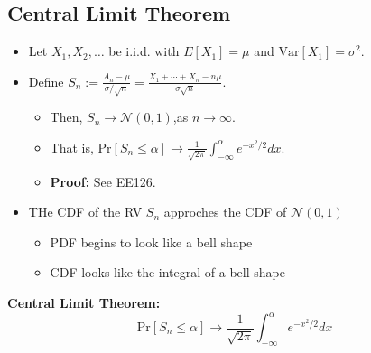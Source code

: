 \documentclass{article}
\newcommand{\x}[1]{\textrm{#1}}
\newcommand{\pr}[1]{\textrm{Pr}[#1]}
\newcommand{\eq}[1]{\begin{equation}#1\end{equation}}
\newcommand{\eqs}[1]{\begin{mdframed}#1\end{mdframed}}
\newcommand{\items}[1]{\begin{itemize}#1\end{itemize}}
\newcommand{\E}[1]{E[#1]}
\newcommand{\var}[1]{\x{Var}[#1]}
\newcommand{\ninfty}{n\rightarrow\infty}
\newcommand{\cur}{\mathscr}
\newcommand{\intlim}[2]{\int_{#1}^{#2}}
\begin{document}
\subsection*{Central Limit Theorem}
\items{
    \item  Let $X_1,X_2,\ldots$ be i.i.d. with $\E{X_1} = \mu$ and $\var{X_1} = \sigma^2$.
    \item Define $S_n := \frac{A_n - \mu}{\sigma/\sqrt{n}}=\frac{X_1 +\cdots+X_n -n\mu}{\sigma\sqrt{n}}$.
    \items{
        \item Then, $S_n \rightarrow\cur{N}(0,1)$,as $\ninfty$.
        \item That is, $\pr{S_n \le \alpha} \rightarrow\frac{1}{\sqrt{2\pi}}\intlim{-\infty}{\alpha}e^{-x^2/2}dx$.
        \item \textbf{Proof:} See EE126.
    }
    \item THe CDF of the RV $S_n$ approches the CDF of $\cur{N}(0,1)$
    \items{
        \item PDF begins to look like a bell shape
        \item CDF looks like the integral of a bell shape
    }
}
\eqs{
\textbf{Central Limit Theorem:}
\eq{\pr{S_n \le \alpha} \rightarrow\frac{1}{\sqrt{2\pi}}\intlim{-\infty}{\alpha}e^{-x^2/2}dx}
}
\end{document}
